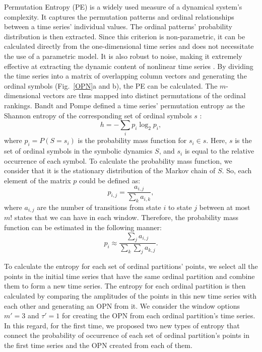 \documentclass[%
 aip,
 amsmath,amssymb,
 reprint,%
]{revtex4-1}
\newcommand{\ignore}[2]{\hspace{0in}#2}
\begin{document}
Permutation Entropy (PE) is a widely used measure of a dynamical system's complexity. It captures the permutation patterns and ordinal relationships between a time series' individual values. The ordinal patterns' probability distribution is then extracted. Since this criterion is non-parametric, it can be calculated directly from the one-dimensional time series and does not necessitate the use of a parametric model. It is also robust to noise, making it extremely effective at extracting the dynamic content of nonlinear time series \cite{r10}. By dividing the time series into a matrix of overlapping column vectors and generating the ordinal symbols (Fig.~\ref{OPN}a and b), the PE can be calculated. The $m$-dimensional vectors are thus mapped into distinct permutations of the ordinal rankings. Bandt and Pompe defined a time series' permutation entropy as the Shannon entropy of the corresponding set of ordinal symbols $s$ \cite{r11}: \ignore{\cite{r9}:}
\begin{equation}
h = - \sum_{i} p_i \log_2 p_i,
\label{eq.1}
\end{equation}
where $p_i = P (S = s_i)$ is the probability mass function for $s_i \in s$. Here, $s$ is the set of ordinal symbols in the symbolic dynamics $S$, and $s_i$ is equal to the relative occurrence of each symbol. To calculate the probability mass function, we consider that it is the stationary distribution of the Markov chain of $S$. So, each element of the matrix $p$ could be defined as:
\begin{equation}
p_{i,j} = \frac{a_{i,j}}{\sum_{k} a_{i,k}},
\label{eq.2}
\end{equation}
where $a_{i,j}$ are the number of transitions from state $i$ to state $j$ between at most $m!$ states that we can have in each window. Therefore, the probability mass function can be estimated in the following manner:
\begin{equation}
p_i \approx \frac{\sum_{j} a_{i,j}}{\sum_{k}\sum_{j} a_{k,j}}.
\label{eq.3} 
\end{equation}

To calculate the entropy for each set of ordinal partitions' points, we select all the points in the initial time series that have the same ordinal partition and combine them to form a new time series. The entropy for each ordinal partition is then calculated by comparing the amplitudes of the points in this new time series with each other and generating an OPN from it. We consider the window options $m' = 3$ and $\tau' = 1$ for creating the OPN from each ordinal partition's time series.
In this regard, for the first time, we proposed two new types of entropy that connect the probability of occurrence of each set of ordinal partition's points in the first time series and the OPN created from each of them. 
\end{document}
